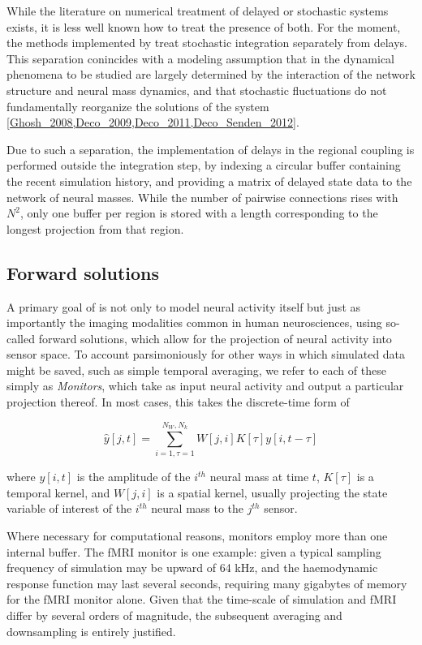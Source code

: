 	While the literature on numerical treatment of delayed or 
	stochastic systems exists, it is less well known how to treat 
	the presence of both. For the moment, the methods implemented by \TVB
	treat stochastic integration separately from delays. 
	This separation conincides with a modeling assumption that in
	\TVB the dynamical phenomena to be studied are largely determined
	by the interaction of the network structure and neural mass dynamics, 
	and that stochastic fluctuations do not fundamentally reorganize the
	solutions of the system \ref{Ghosh_2008,Deco_2009,Deco_2011,Deco_Senden_2012}.

	Due to such a separation, the implementation of delays in the
	regional coupling is performed outside the integration step,
	by indexing a circular buffer containing the recent simulation 
	history, and providing a matrix of delayed state data to the 
	network of neural masses. While the number of pairwise
	connections rises with $N^2$, only one buffer per region 
	is stored with a length corresponding to the longest projection
	from that region.

\subsection{Forward solutions}

	A primary goal of \TVB is not only to model neural activity itself
	but just as importantly the imaging modalities common in human 
	neurosciences, using so-called forward solutions, which allow for
	the projection of neural activity into sensor space. To account
	parsimoniously for other ways in which simulated data might be saved, 
	such as simple temporal averaging, we refer to each of these simply as 
	\textit{Monitors}, which take as input neural activity and 
	output a particular projection thereof. In most cases, this 
	takes the discrete-time form of

	\[ \hat{y}[j, t] = \sum_{i=1, \tau=1}^{N_W, N_k} W[j, i] K[\tau] y[i, t-\tau] \]

	\noindent where $y[i, t]$ is the amplitude of the $i^{th}$ neural mass at time
	$t$, $K[\tau]$ is a temporal kernel, and $W[j, i]$ is a spatial kernel,
	usually projecting the state variable of interest of the $i^{th}$ 
	neural mass to the $j^{th}$ sensor. 

	Where necessary for computational reasons, monitors employ more than 
	one internal buffer. The fMRI monitor is one 
	example: given a typical sampling frequency of simulation may be upward of 
	64 kHz, and the haemodynamic response function may last several seconds, 
	requiring many gigabytes of memory for the fMRI monitor alone. Given that 
	the time-scale of simulation and fMRI differ by several orders of magnitude, 
	the subsequent averaging and downsampling is entirely justified. 

